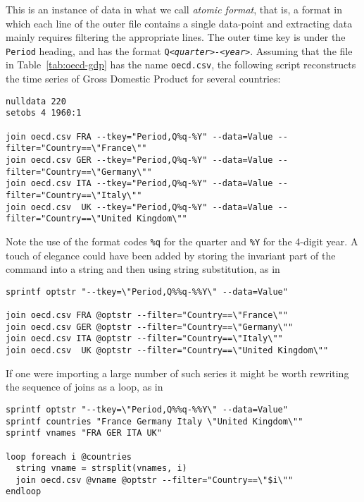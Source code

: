 This is an instance of data in what we call \emph{atomic format}, that
is, a format in which each line of the outer file contains a single
data-point and extracting data mainly requires filtering the appropriate
lines. The outer time key is under the \texttt{Period} heading, and
has the format \texttt{Q\emph{<quarter>-<year>}}. Assuming that the
file in Table~\ref{tab:oecd-gdp} has the name \texttt{oecd.csv}, the
following script reconstructs the time series of Gross Domestic
Product for several countries:

\begin{footnotesize}
\begin{verbatim}
nulldata 220
setobs 4 1960:1

join oecd.csv FRA --tkey="Period,Q%q-%Y" --data=Value --filter="Country==\"France\""
join oecd.csv GER --tkey="Period,Q%q-%Y" --data=Value --filter="Country==\"Germany\""
join oecd.csv ITA --tkey="Period,Q%q-%Y" --data=Value --filter="Country==\"Italy\""
join oecd.csv  UK --tkey="Period,Q%q-%Y" --data=Value --filter="Country==\"United Kingdom\""
\end{verbatim}
\end{footnotesize}

Note the use of the format codes \verb|%q| for the quarter and
\verb|%Y| for the 4-digit year. A touch of elegance could
have been added by storing the invariant part of the 
command into a string and then using string substitution, as in

\begin{footnotesize}
\begin{verbatim}
sprintf optstr "--tkey=\"Period,Q%%q-%%Y\" --data=Value"

join oecd.csv FRA @optstr --filter="Country==\"France\""
join oecd.csv GER @optstr --filter="Country==\"Germany\""
join oecd.csv ITA @optstr --filter="Country==\"Italy\""
join oecd.csv  UK @optstr --filter="Country==\"United Kingdom\""
\end{verbatim}
\end{footnotesize}

If one were importing a large number of such series it might be worth
rewriting the sequence of joins as a loop, as in

\begin{footnotesize}
\begin{verbatim}
sprintf optstr "--tkey=\"Period,Q%%q-%%Y\" --data=Value"
sprintf countries "France Germany Italy \"United Kingdom\""
sprintf vnames "FRA GER ITA UK"

loop foreach i @countries
  string vname = strsplit(vnames, i)
  join oecd.csv @vname @optstr --filter="Country==\"$i\""
endloop
\end{verbatim}
\end{footnotesize}
